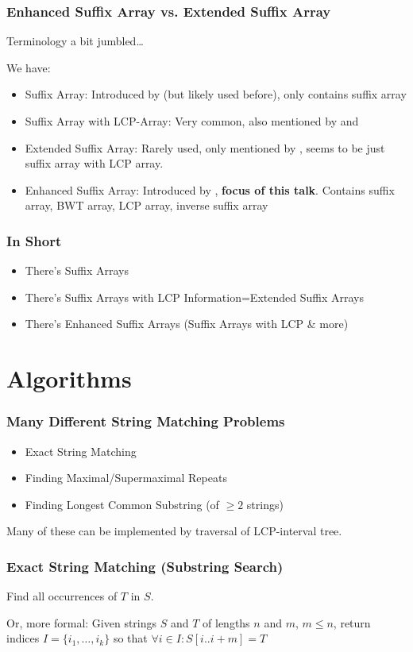 \documentclass[compress,handout]{beamer} %
\begin{document}
\begin{frame}
	\frametitle{Enhanced Suffix Array vs. Extended Suffix Array}
	Terminology a bit jumbled…

	We have:
	\begin{itemize}
		\item Suffix Array: Introduced by \cite{manber1993suffix} (but likely used before), only contains suffix array
		\item Suffix Array with LCP-Array: Very common, also mentioned by \cite{manber1993suffix} and \cite{gusfield1997algorithms}
		\item Extended Suffix Array: Rarely used, only mentioned by \cite{salson2010dynamic}, seems to be just suffix array with LCP array.
		\item Enhanced Suffix Array: Introduced by \cite{abouelhoda2002enhanced}, \textbf{focus of this talk}. Contains suffix array, BWT array, LCP array, inverse suffix array
	\end{itemize}
\end{frame}

\begin{frame}
	\frametitle{In Short}
	\begin{itemize}
		\item There's Suffix Arrays
		\item There's Suffix Arrays with LCP Information=Extended Suffix Arrays
		\item There's Enhanced Suffix Arrays (Suffix Arrays with LCP \& more)
	\end{itemize}
\end{frame}

\section{Algorithms}

\begin{frame}
	\frametitle{Many Different String Matching Problems}
	\begin{itemize}
		\item Exact String Matching
		\item Finding Maximal/Supermaximal Repeats
		\item Finding Longest Common Substring (of $\ge 2$ strings)
	\end{itemize}
	Many of these can be implemented by traversal of LCP-interval tree.
\end{frame}

\begin{frame}
	\frametitle{Exact String Matching (Substring Search)}
	Find all occurrences of $T$ in $S$.

	Or, more formal: Given strings $S$ and $T$ of lengths $n$ and
	$m$, $m \le n$, return indices $I=\{i_{1}, \ldots, i_{k}\}$
	so that $\forall i \in I: S[i..i+m]=T$
\end{frame}
\end{document}
